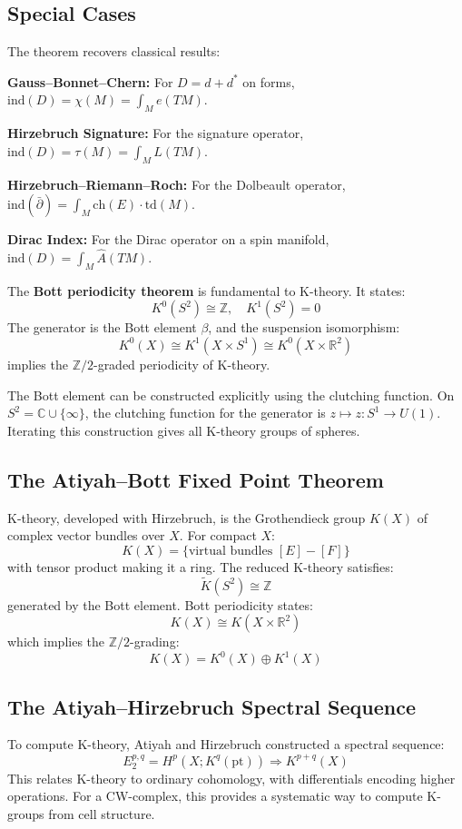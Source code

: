 \subsection*{Special Cases}

The theorem recovers classical results:

\textbf{Gauss--Bonnet--Chern:} For $D = d + d^*$ on forms,
$\text{ind}(D) = \chi(M) = \int_M e(TM)$.

\textbf{Hirzebruch Signature:} For the signature operator,
$\text{ind}(D) = \tau(M) = \int_M L(TM)$.

\textbf{Hirzebruch--Riemann--Roch:} For the Dolbeault operator,
$\text{ind}(\bar{\partial}) = \int_M \text{ch}(E) \cdot \text{td}(M)$.

\textbf{Dirac Index:} For the Dirac operator on a spin manifold,
$\text{ind}(D) = \int_M \widehat{A}(TM)$.

The \textbf{Bott periodicity theorem} is fundamental to K-theory. It states:
\[K^0(S^2) \cong \mathbb{Z}, \quad K^1(S^2) = 0\]
The generator is the Bott element $\beta$, and the suspension isomorphism:
\[K^0(X) \cong K^1(X \times S^1) \cong K^0(X \times \mathbb{R}^2)\]
implies the $\mathbb{Z}/2$-graded periodicity of K-theory.

The Bott element can be constructed explicitly using the clutching function.
On $S^2 = \mathbb{C} \cup \{\infty\}$, the clutching function for the generator
is $z \mapsto z: S^1 \to U(1)$. Iterating this construction gives all K-theory
groups of spheres.

\subsection*{The Atiyah--Bott Fixed Point Theorem}

K-theory, developed with Hirzebruch, is the Grothendieck group $K(X)$ of
complex vector bundles over $X$. For compact $X$:
\[K(X) = \{\text{virtual bundles } [E] - [F]\}\]
with tensor product making it a ring. The reduced K-theory satisfies:
\[\widetilde{K}(S^2) \cong \mathbb{Z}\]
generated by the Bott element. Bott periodicity states:
\[K(X) \cong K(X \times \mathbb{R}^2)\]
which implies the $\mathbb{Z}/2$-grading:
\[K(X) = K^0(X) \oplus K^1(X)\]

\subsection*{The Atiyah--Hirzebruch Spectral Sequence}

To compute K-theory, Atiyah and Hirzebruch constructed a spectral sequence:
\[E_2^{p,q} = H^p(X; K^q(\text{pt})) \Rightarrow K^{p+q}(X)\]
This relates K-theory to ordinary cohomology, with differentials encoding
higher operations. For a CW-complex, this provides a systematic way to
compute K-groups from cell structure.

